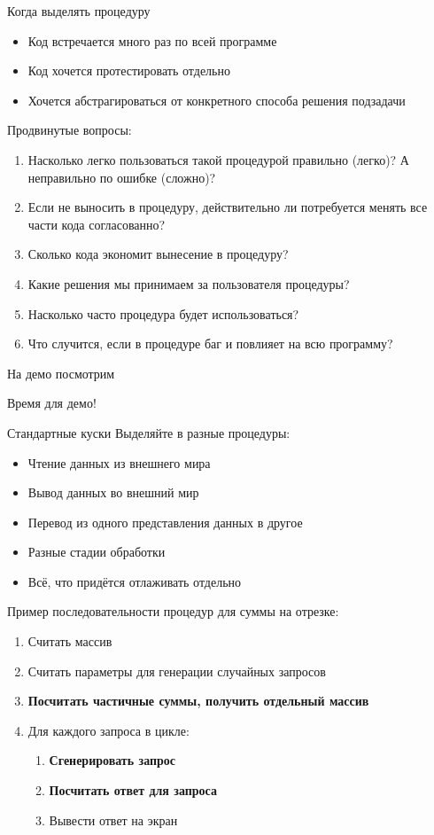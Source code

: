 \begin{frame}{Когда выделять процедуру}
	\begin{itemize}
	\item Код встречается много раз по всей программе
	\item Код хочется протестировать отдельно
	\item Хочется абстрагироваться от конкретного способа решения подзадачи
	\end{itemize}
	
	Продвинутые вопросы:
	\begin{enumerate}
	\item
		Насколько легко пользоваться такой процедурой правильно (легко)?
		А неправильно по ошибке (сложно)?
	\item
		Если не выносить в процедуру, действительно ли потребуется
		менять все части кода согласованно?
	\item
		Сколько кода экономит вынесение в процедуру?
	\item
		Какие решения мы принимаем за пользователя процедуры?
	\item
		Насколько часто процедура будет использоваться?
	\item
		Что случится, если в процедуре баг и повлияет на всю программу?
	\end{enumerate}

	На демо посмотрим
\end{frame}

\begin{frame}{Время для демо!}
\end{frame}

\begin{frame}{Стандартные куски}
	Выделяйте в разные процедуры:
	\begin{itemize}
	\item Чтение данных из внешнего мира
	\item Вывод данных во внешний мир
	\item Перевод из одного представления данных в другое
	\item Разные стадии обработки
	\item Всё, что придётся отлаживать отдельно
	\end{itemize}
	
	Пример последовательности процедур для суммы на отрезке:
	\begin{enumerate}
	\item Считать массив
	\item Считать параметры для генерации случайных запросов
	\item \textbf{Посчитать частичные суммы, получить отдельный массив}
	\item Для каждого запроса в цикле:
		\begin{enumerate}
		\item \textbf{Сгенерировать запрос}
		\item \textbf{Посчитать ответ для запроса}
		\item Вывести ответ на экран
		\end{enumerate}
	\end{enumerate}
\end{frame}
